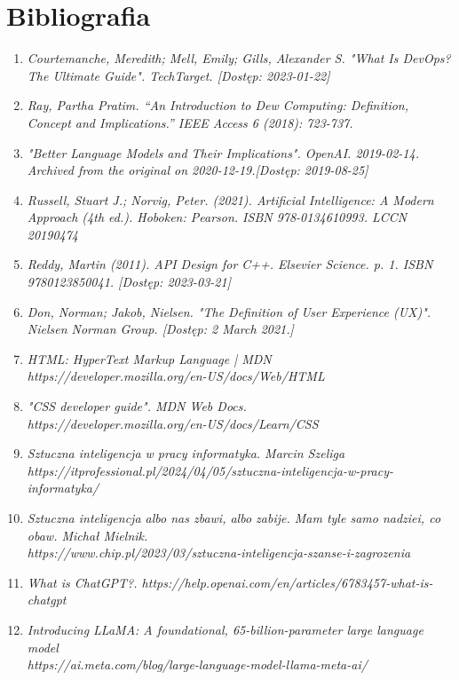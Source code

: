 \section{Bibliografia}

\begin{enumerate}

\item {\textit {Courtemanche, Meredith; Mell, Emily; Gills, Alexander S. "What Is DevOps? The Ultimate Guide". TechTarget. [Dostęp: 2023-01-22]}}
\item {\textit {Ray, Partha Pratim. “An Introduction to Dew Computing: Definition, Concept and Implications.” IEEE Access 6 (2018): 723-737.}}

\item {\textit {"Better Language Models and Their Implications". OpenAI. 2019-02-14. Archived from the original on 2020-12-19.[Dostęp: 2019-08-25]}}
\item {\textit {Russell, Stuart J.; Norvig, Peter. (2021). Artificial Intelligence: A Modern Approach (4th ed.). Hoboken: Pearson. ISBN 978-0134610993. LCCN 20190474}}
\item {\textit {Reddy, Martin (2011). API Design for C++. Elsevier Science. p. 1. ISBN 9780123850041. [Dostęp: 2023-03-21]}}
\item {\textit { Don, Norman; Jakob, Nielsen. "The Definition of User Experience (UX)". Nielsen Norman Group. [Dostęp: 2 March 2021.]}}
\item {\textit {HTML: HyperText Markup Language | MDN \\ https://developer.mozilla.org/en-US/docs/Web/HTML}}
\item {\textit { "CSS developer guide". MDN Web Docs. \\ https://developer.mozilla.org/en-US/docs/Learn/CSS}}
\item {\textit {Sztuczna inteligencja w pracy informatyka. Marcin Szeliga \\ https://itprofessional.pl/2024/04/05/sztuczna-inteligencja-w-pracy-informatyka/}}
\item {\textit {Sztuczna inteligencja albo nas zbawi, albo zabije. Mam tyle samo nadziei, co obaw. Michał Mielnik. \\ https://www.chip.pl/2023/03/sztuczna-inteligencja-szanse-i-zagrozenia}}
\item {\textit {What is ChatGPT?. https://help.openai.com/en/articles/6783457-what-is-chatgpt}}
\item {\textit {Introducing LLaMA: A foundational, 65-billion-parameter large language model \\ https://ai.meta.com/blog/large-language-model-llama-meta-ai/}}

\end{enumerate}
